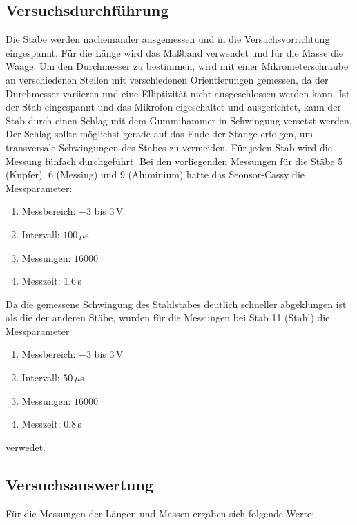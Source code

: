 \documentclass[a4paper, 12pt]{scrartcl}
\begin{document}
\subsection{Versuchsdurchführung}

Die Stäbe werden nacheinander ausgemessen und in die Versuchsvorrichtung eingespannt. Für die Länge wird das Maßband verwendet und für die Masse die Waage. Um den Durchmesser zu bestimmen, wird mit einer Mikrometerschraube an verschiedenen Stellen mit verschiedenen Orientierungen gemessen, da der Durchmesser variieren und eine Elliptizität nicht ausgeschlossen werden kann. Ist der Stab eingespannt und das Mikrofon eigeschaltet und ausgerichtet, kann der Stab durch einen Schlag mit dem Gummihammer in Schwingung versetzt werden. Der Schlag sollte möglichst gerade auf das Ende der Stange erfolgen, um transversale Schwingungen des Stabes zu vermeiden. Für jeden Stab wird die Messung fünfach durchgeführt. Bei den vorliegenden Messungen für die Stäbe 5 (Kupfer), 6 (Messing) und 9 (Aluminium) hatte das Seonsor-Cassy die Messparameter:
\begin{enumerate}
\item Messbereich: $-3$ bis $3\,$V
\item Intervall: $100\,\mu$s
\item Messungen: $16000$
\item Messzeit: $1.6\,$s
\end{enumerate}
Da die gemessene Schwingung des Stahlstabes deutlich schneller abgeklungen ist als die der anderen Stäbe, wurden für die Messungen bei Stab 11 (Stahl) die Messparameter
\begin{enumerate}
\item Messbereich: $-3$ bis $3\,$V
\item Intervall: $50\,\mu$s
\item Messungen: $16000$
\item Messzeit: $0.8\,$s
\end{enumerate}
verwedet.

\subsection{Versuchsauswertung}

Für die Messungen der Längen und Massen ergaben sich folgende Werte:
\end{document}
